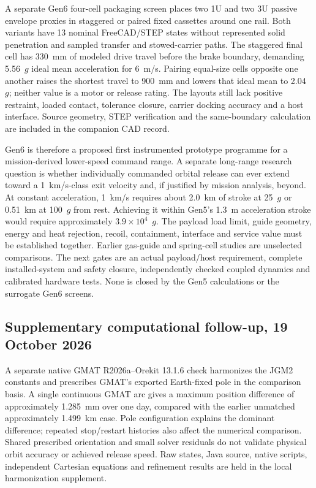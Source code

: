 \documentclass[conference]{IEEEtran}
\begin{document}
A separate Gen6 four-cell packaging screen places two 1U and two 3U passive envelope proxies in staggered or paired fixed cassettes around one rail. Both variants have 13 nominal FreeCAD/STEP states without represented solid penetration and sampled transfer and stowed-carrier paths. The staggered final cell has 330~mm of modeled drive travel before the brake boundary, demanding 5.56~$g$ ideal mean acceleration for 6~m/s. Pairing equal-size cells opposite one another raises the shortest travel to 900~mm and lowers that ideal mean to 2.04~$g$; neither value is a motor or release rating. The layouts still lack positive restraint, loaded contact, tolerance closure, carrier docking accuracy and a host interface. Source geometry, STEP verification and the same-boundary calculation are included in the companion CAD record.

Gen6 is therefore a proposed first instrumented prototype programme for a mission-derived lower-speed command range. A separate long-range research question is whether individually commanded orbital release can ever extend toward a 1~km/s-class exit velocity and, if justified by mission analysis, beyond. At constant acceleration, 1~km/s requires about 2.0~km of stroke at 25~$g$ or 0.51~km at 100~$g$ from rest. Achieving it within Gen5's 1.3~m acceleration stroke would require approximately $3.9\times10^4$~$g$. The payload load limit, guide geometry, energy and heat rejection, recoil, containment, interface and service value must be established together. Earlier gas-guide and spring-cell studies are unselected comparisons. The next gates are an actual payload/host requirement, complete installed-system and safety closure, independently checked coupled dynamics and calibrated hardware tests. None is closed by the Gen5 calculations or the surrogate Gen6 screens.


\subsection{Supplementary computational follow-up, 19 October 2026}
A separate native GMAT R2026a--Orekit 13.1.6 check harmonizes the JGM2 constants and prescribes GMAT's exported Earth-fixed pole in the comparison basis. A single continuous GMAT arc gives a maximum position difference of approximately 1.285~mm over one day, compared with the earlier unmatched approximately 1.499~km case. Pole configuration explains the dominant difference; repeated stop/restart histories also affect the numerical comparison. Shared prescribed orientation and small solver residuals do not validate physical orbit accuracy or achieved release speed. Raw states, Java source, native scripts, independent Cartesian equations and refinement results are held in the local harmonization supplement.
\end{document}
